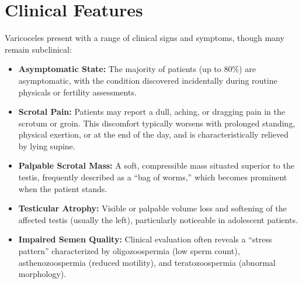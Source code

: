 \section*{Clinical Features}
Varicoceles present with a range of clinical signs and symptoms, though many remain subclinical:
\begin{itemize}
  \item \textbf{Asymptomatic State:} The majority of patients (up to 80\%) are asymptomatic, with the condition discovered incidentally during routine physicals or fertility assessments.
  \item \textbf{Scrotal Pain:} Patients may report a dull, aching, or dragging pain in the scrotum or groin. This discomfort typically worsens with prolonged standing, physical exertion, or at the end of the day, and is characteristically relieved by lying supine.
  \item \textbf{Palpable Scrotal Mass:} A soft, compressible mass situated superior to the testis, frequently described as a ``bag of worms,'' which becomes prominent when the patient stands.
  \item \textbf{Testicular Atrophy:} Visible or palpable volume loss and softening of the affected testis (usually the left), particularly noticeable in adolescent patients.
  \item \textbf{Impaired Semen Quality:} Clinical evaluation often reveals a ``stress pattern'' characterized by oligozoospermia (low sperm count), asthenozoospermia (reduced motility), and teratozoospermia (abnormal morphology).
\end{itemize}

